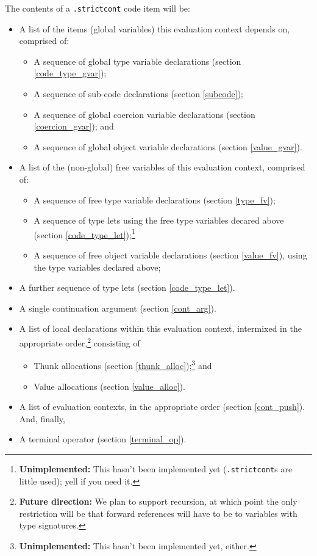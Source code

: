 \documentclass{report}
\newcommand\stringcode[1]{\texttt{#1}}
\newcommand\unimpl[1]{\footnote{\textbf{Unimplemented: }#1}}
\newcommand\future[1]{\footnote{\textbf{Future direction:} #1}}
\begin{document}
The contents of a \stringcode{.strictcont} code item will be:
\begin{itemize}
    \item A list of the items (global variables) this evaluation context depends on, comprised of:
        \begin{itemize}
            \item A sequence of global type variable declarations (section \ref{code_type_gvar});
            \item A sequence of sub-code declarations (section \ref{subcode});
            \item A sequence of global coercion variable declarations (section \ref{coercion_gvar}); and
            \item A sequence of global object variable declarations (section \ref{value_gvar}).
        \end{itemize}
    \item A list of the (non-global) free variables of this evaluation context, comprised of:
        \begin{itemize}
            \item A sequence of free type variable declarations (section \ref{type_fv});
            \item A sequence of type lets using the free type variables decared above (section \ref{code_type_let});\unimpl{This hasn't been implemented yet (\stringcode{.strictcont}s are little used); yell if you need it.}
            \item A sequence of free object variable declarations (section \ref{value_fv}), using the type variables declared above;
        \end{itemize}
    \item A further sequence of type lets (section \ref{code_type_let}).
    \item A single continuation argument (section \ref{cont_arg}).
    \item A list of local declarations within this evaluation context,
        intermixed in the appropriate order,\future{We plan to support recursion, at which point the only restriction will be that forward references will have to be to variables with type signatures.}
        consisting of
        \begin{itemize}
            \item Thunk allocations (section \ref{thunk_alloc});\unimpl{This hasn't been implemented yet, either.} and
            \item Value allocations (section \ref{value_alloc}).
        \end{itemize}
    \item A list of evaluation contexts, in the appropriate order (section \ref{cont_push}).
        And, finally,
    \item A terminal operator (section \ref{terminal_op}).
\end{itemize}
\end{document}
